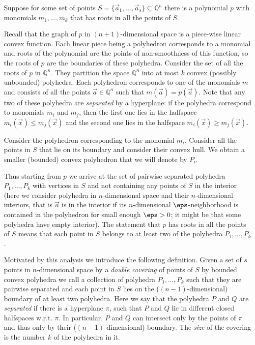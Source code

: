 \documentclass[11pt]{article}
\newcommand{\bb}[1]{\mathbb{#1}}
\begin{document}
Suppose for some set of points $S = \{\vec{a}_1, \ldots, \vec{a}_s\} \subseteq \bb{Q}^n$ there is a polynomial $p$ with monomials $m_1,\ldots, m_k$ that has roots in all the points of $S$.

Recall that the graph of $p$ in $(n+1)$-dimensional space is a piece-wise linear convex function. Each linear piece being a polyhedron corresponds to a monomial and roots of the polynomial are the points of non-smoothness of this function, so the roots of $p$ are the boundaries of these polyhedra.
Consider the set of all the roots of $p$ in $\bb{Q}^n$. They partition the space $\bb{Q}^n$ into at most $k$ convex (possibly unbounded) polyhedra. Each polyhedron corresponds to one of the monomials $m$ and consists of all the points
$\vec{a}\in \bb{Q}^n$ such that $m(\vec{a})=p(\vec{a})$. Note that any two of these polyhedra are \emph{separated} by a hyperplane: if the polyhedra correspond to monomials $m_i$ and $m_j$, then the first one lies in the halfspace $m_i(\vec{x}) \leq m_{j}(\vec{x})$ and the second one lies in the halfspace $m_{i}(\vec{x})\geq m_j(\vec{x})$.

Consider the polyhedron corresponding to the monomial $m_i$. Consider all the points in $S$ that lie on its boundary and consider their convex hull. We obtain a smaller (bounded) convex polyhedron that we will denote by $P_i$. 

Thus starting from $p$ we arrive at the set of pairwise separated polyhedra $P_1,\ldots, P_k$ with vertices in $S$ and not containing any points of $S$ in the interior (here we consider polyhedra in $n$-dimensional space and their $n$-dimensional interiors, that is $\vec{a}$ is in the interior if its $n$-dimensional $\eps$-neighborhood is contained in the polyhedron for small enough $\eps>0$; it might be that some polyhedra have empty interior). The statement that $p$ has roots in all the points of $S$ means that each point in $S$ belongs to at least two of the polyhedra $P_1,\ldots, P_k$. 

Motivated by this analysis we introduce the following definition. Given a set of $s$ points in $n$-dimensional space by a \emph{double covering} of points of $S$ by bounded convex polyhedra we call a collection of polyhedra $P_1,\ldots, P_k$ such that they are pairwise separated and each point in $S$ lies on the ($(n-1)$-dimensional) boundary of at least two polyhedra. Here we say that the polyhedra $P$ and $Q$ are \emph{separated} if there is a hyperplane $\pi$, such that $P$ and $Q$ lie in different closed halfspaces w.r.t. $\pi$. In particular, $P$ and $Q$ can intersect only by the points of $\pi$ and thus only by their ($(n-1)$-dimensional) boundary. 
The \emph{size} of the covering is the number $k$ of the polyhedra in it.
\end{document}
